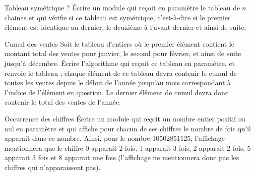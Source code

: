 \begin{Exercice}{Tableau symétrique ?}
	Écrire un module qui reçoit en paramètre le tableau
	 de $n$ chaines et qui
	vérifie si ce tableau est symétrique, c’est-à-dire si le premier
	élément est identique au dernier, le deuxième à l’avant-dernier et
	ainsi de suite.
\end{Exercice}

\begin{Exercice}{Cumul des ventes}
	Soit le tableau  d’entiers où le
	premier élément contient le montant total des ventes pour janvier, le
	second pour février, et ainsi de suite jusqu'à
	décembre. Écrire l’algorithme qui reçoit ce tableau en paramètre, et
	renvoie le tableau  ; chaque élément
	de ce tableau devra contenir le cumul de toutes les ventes depuis le
	début de l’année jusqu’au mois correspondant à
	l'indice de l’élément en question. Le dernier élément
	de cumul devra donc contenir le total des ventes de l’année.
\end{Exercice}

\bigskip
\begin{Exercice}{Occurrence des chiffres}
	Écrire un module qui reçoit un nombre entier positif ou nul en paramètre
	et qui affiche pour chacun de ses chiffres le nombre de fois qu’il
	apparait dans ce nombre. Ainsi, pour le nombre 10502851125, l’affichage
	mentionnera que le chiffre 0 apparait 2 fois, 1 apparait 3 fois, 2
	apparait 2 fois, 5 apparait 3 fois et 8 apparait une fois (l’affichage
	ne mentionnera donc pas les chiffres qui n’apparaissent pas).
\end{Exercice}

